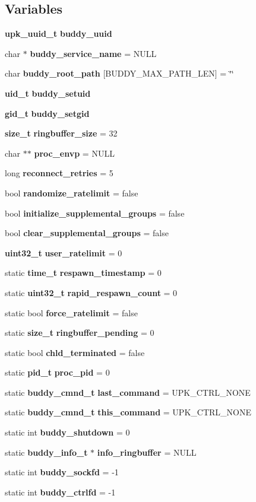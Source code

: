 \subsection*{Variables}
\begin{DoxyCompactItemize}
\item 
{\bf upk\_\-uuid\_\-t} {\bf buddy\_\-uuid}
\item 
char $\ast$ {\bf buddy\_\-service\_\-name} = NULL
\item 
char {\bf buddy\_\-root\_\-path} [BUDDY\_\-MAX\_\-PATH\_\-LEN] = \char`\"{}\char`\"{}
\item 
{\bf uid\_\-t} {\bf buddy\_\-setuid}
\item 
{\bf gid\_\-t} {\bf buddy\_\-setgid}
\item 
{\bf size\_\-t} {\bf ringbuffer\_\-size} = 32
\item 
char $\ast$$\ast$ {\bf proc\_\-envp} = NULL
\item 
long {\bf reconnect\_\-retries} = 5
\item 
bool {\bf randomize\_\-ratelimit} = false
\item 
bool {\bf initialize\_\-supplemental\_\-groups} = false
\item 
bool {\bf clear\_\-supplemental\_\-groups} = false
\item 
{\bf uint32\_\-t} {\bf user\_\-ratelimit} = 0
\item 
static {\bf time\_\-t} {\bf respawn\_\-timestamp} = 0
\item 
static {\bf uint32\_\-t} {\bf rapid\_\-respawn\_\-count} = 0
\item 
static bool {\bf force\_\-ratelimit} = false
\item 
static {\bf size\_\-t} {\bf ringbuffer\_\-pending} = 0
\item 
static bool {\bf chld\_\-terminated} = false
\item 
static {\bf pid\_\-t} {\bf proc\_\-pid} = 0
\item 
static {\bf buddy\_\-cmnd\_\-t} {\bf last\_\-command} = UPK\_\-CTRL\_\-NONE
\item 
static {\bf buddy\_\-cmnd\_\-t} {\bf this\_\-command} = UPK\_\-CTRL\_\-NONE
\item 
static int {\bf buddy\_\-shutdown} = 0
\item 
static {\bf buddy\_\-info\_\-t} $\ast$ {\bf info\_\-ringbuffer} = NULL
\item 
static int {\bf buddy\_\-sockfd} = -\/1
\item 
static int {\bf buddy\_\-ctrlfd} = -\/1
\item 
$$
\end{DoxyCompactItemize}
